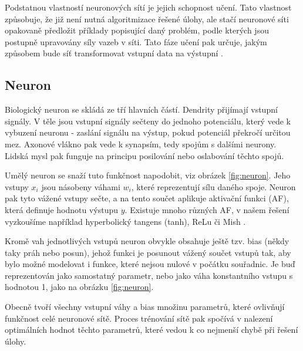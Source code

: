Podstatnou vlastností neuronových sítí je jejich schopnost učení. Tato
vlastnost způsobuje, že již není nutná algoritmizace řešené úlohy, ale stačí
neuronové síti opakovaně předložit příklady popisující daný problém, podle
kterých jsou postupně upravovány síly vazeb v síti. Tato fáze učení pak určuje,
jakým způsobem bude síť transformovat vstupní data na výstupní
\cite{Vondrak1994}.

\subsection{Neuron}
Biologický neuron se skládá ze tří hlavních částí. Dendrity přijímají vstupní
signály. V těle jsou vstupní signály sečteny do jednoho potenciálu, který vede
k vybuzení neuronu - zaslání signálu na výstup, pokud potenciál překročí
určitou mez. Axonové vlákno pak vede k synapsím, tedy spojům s dalšími neurony.
Lidská mysl pak funguje na principu posilování nebo oslabování těchto spojů.

Umělý neuron se snaží tuto funkčnost napodobit, viz obrázek \ref{fig:neuron}.
Jeho vstupy $x_i$ jsou násobeny váhami $w_i$, které reprezentují sílu daného
spoje. Neuron pak tyto vážené vstupy sečte, a na tento součet aplikuje
aktivační funkci (AF), která definuje hodnotu výstupu $y$. Existuje mnoho
různých AF, v našem řešení vyzkoušíme například hyperbolický tangens (tanh),
ReLu či Mish \cite{afreview}. 

Kromě vah jednotlivých vstupů neuron obvykle obsahuje ještě tzv. bias (někdy
taky práh nebo posun), jehož funkci je posunout vážený součet vstupů tak, aby
bylo možné modelovat i funkce, které nejsou nulové v počátku souřadnic. Je buď
reprezentován jako samostatný parametr, nebo jako váha konstantního vstupu s
hodnotou 1, jako na obrázku \ref{fig:neuron}.






Obecně tvoří všechny vstupní váhy a bias množinu parametrů, které ovlivňují
funkčnost celé neuronové sítě. Proces trénování sítě pak spočívá v nalezení
optimálních hodnot těchto parametrů, které vedou k co nejmenší chybě při řešení
úlohy.

